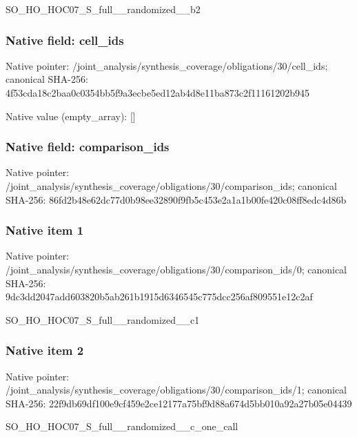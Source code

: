 \documentclass[10pt,a4paper]{article}
\begin{document}
\begingroup\raggedright\sloppy SO\_\allowbreak{}HO\_\allowbreak{}HOC07\_\allowbreak{}S\_\allowbreak{}full\_\allowbreak{}\_\allowbreak{}randomized\_\allowbreak{}\_\allowbreak{}b2\par\endgroup

\subsubsection{Native field: cell\_\allowbreak{}ids}
Native pointer: /joint\_\allowbreak{}analysis/synthesis\_\allowbreak{}coverage/obligations/30/cell\_\allowbreak{}ids; canonical SHA-256: 4f53cda18c2baa0c0354bb5f9a3ecbe5ed12ab4d8e11ba873c2f11161202b945

Native value (empty\_\allowbreak{}array): []

\subsubsection{Native field: comparison\_\allowbreak{}ids}
Native pointer: /joint\_\allowbreak{}analysis/synthesis\_\allowbreak{}coverage/obligations/30/comparison\_\allowbreak{}ids; canonical SHA-256: 86fd2b48e62dc77d0b98ee32890f9fb5c453e2a1a1b00fe420c08ff8edc4d86b

\subsubsection{Native item 1}
Native pointer: /joint\_\allowbreak{}analysis/synthesis\_\allowbreak{}coverage/obligations/30/comparison\_\allowbreak{}ids/0; canonical SHA-256: 9dc3dd2047add603820b5ab261b1915d6346545c775dcc256af809551e12c2af

\begingroup\raggedright\sloppy SO\_\allowbreak{}HO\_\allowbreak{}HOC07\_\allowbreak{}S\_\allowbreak{}full\_\allowbreak{}\_\allowbreak{}randomized\_\allowbreak{}\_\allowbreak{}c1\par\endgroup

\subsubsection{Native item 2}
Native pointer: /joint\_\allowbreak{}analysis/synthesis\_\allowbreak{}coverage/obligations/30/comparison\_\allowbreak{}ids/1; canonical SHA-256: 22f9db69df100e9cf459e2ce12177a75bf9d88a674d5bb010a92a27b05e04439

\begingroup\raggedright\sloppy SO\_\allowbreak{}HO\_\allowbreak{}HOC07\_\allowbreak{}S\_\allowbreak{}full\_\allowbreak{}\_\allowbreak{}randomized\_\allowbreak{}\_\allowbreak{}c\_\allowbreak{}one\_\allowbreak{}call\par\endgroup
\end{document}
